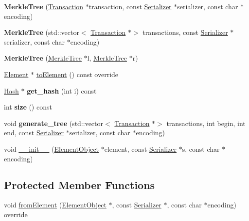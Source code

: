 \begin{DoxyCompactItemize}
\item 
\mbox{\label{classMerkleTree_a257abaf20fa542b29dfdab95294ae578}} 
{\bfseries Merkle\+Tree} (\mbox{\hyperlink{classTransaction}{Transaction}} $\ast$transaction, const \mbox{\hyperlink{classSerializer}{Serializer}} $\ast$serializer, const char $\ast$encoding)
\item 
\mbox{\label{classMerkleTree_abc65d820b1b59f00350b2f4a4bc580bd}} 
{\bfseries Merkle\+Tree} (std\+::vector$<$ \mbox{\hyperlink{classTransaction}{Transaction}} $\ast$$>$ transactions, const \mbox{\hyperlink{classSerializer}{Serializer}} $\ast$serializer, const char $\ast$encoding)
\item 
\mbox{\label{classMerkleTree_a361a5f238249d4893b000560dcabacde}} 
{\bfseries Merkle\+Tree} (\mbox{\hyperlink{classMerkleTree}{Merkle\+Tree}} $\ast$l, \mbox{\hyperlink{classMerkleTree}{Merkle\+Tree}} $\ast$r)
\item 
\mbox{\hyperlink{classElement}{Element}} $\ast$ \mbox{\hyperlink{classMerkleTree_a4e72819c6cbc49ed8ce092f464711a5f}{to\+Element}} () const override
\item 
\mbox{\label{classMerkleTree_a74d741770514ec323521ec6d79d250f2}} 
\mbox{\hyperlink{classHash}{Hash}} $\ast$ {\bfseries get\+\_\+hash} (int i) const
\item 
\mbox{\label{classMerkleTree_aac309360fa4653451af713a8ce9684bd}} 
int {\bfseries size} () const
\item 
\mbox{\label{classMerkleTree_a543fdfd1f1c4ded332cdeae2cd788aac}} 
void {\bfseries generate\+\_\+tree} (std\+::vector$<$ \mbox{\hyperlink{classTransaction}{Transaction}} $\ast$$>$ transactions, int begin, int end, const \mbox{\hyperlink{classSerializer}{Serializer}} $\ast$serializer, const char $\ast$encoding)
\item 
void \mbox{\hyperlink{classComponent_a28212595f8ee85fe009bd233bc99b2fc}{\+\_\+\+\_\+init\+\_\+\+\_\+}} (\mbox{\hyperlink{classElementObject}{Element\+Object}} $\ast$element, const \mbox{\hyperlink{classSerializer}{Serializer}} $\ast$s, const char $\ast$encoding)
\end{DoxyCompactItemize}
\subsection*{Protected Member Functions}
\begin{DoxyCompactItemize}
\item 
void \mbox{\hyperlink{classMerkleTree_a083ad348bfd770f2400f190112ff39a3}{from\+Element}} (\mbox{\hyperlink{classElementObject}{Element\+Object}} $\ast$, const \mbox{\hyperlink{classSerializer}{Serializer}} $\ast$, const char $\ast$encoding) override
\end{DoxyCompactItemize}
